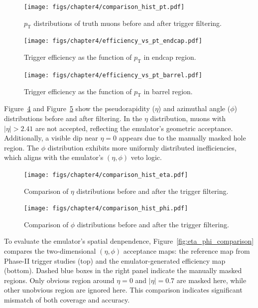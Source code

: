 \begin{figure}[htbp]
  \centering
  \texttt{[image: figs/chapter4/comparison\_hist\_pt.pdf]}
  \caption{$p_\mathrm{T}$ distributions of truth muons before and after trigger filtering.}
  \label{fig:comparison_hist_pt}
\end{figure}

\begin{figure}[htbp]
  \centering
  \texttt{[image: figs/chapter4/efficiency\_vs\_pt\_endcap.pdf]}
  \caption{Trigger efficiency as the function of $p_\mathrm{T}$ in endcap region.}
  \label{fig:eff_pt_endcap}
\end{figure}

\begin{figure}[htbp]
  \centering
  \texttt{[image: figs/chapter4/efficiency\_vs\_pt\_barrel.pdf]}
  \caption{Trigger efficiency as the function of $p_\mathrm{T}$ in barrel region.}
  \label{fig:eff_pt_barrel}
\end{figure}

Figure~\ref{fig:comparison_hist_eta} and Figure~\ref{fig:comparison_hist_phi} show the pseudorapidity ($\eta$) and azimuthal angle ($\phi$) distributions before and after filtering. In the $\eta$ distribution, muons with $|\eta| > 2.41$ are not accepted, reflecting the emulator's geometric acceptance. Additionally, a visible dip near $\eta = 0$ appears due to the manually masked hole region. The $\phi$ distribution exhibits more uniformly distributed inefficiencies, which aligns with the emulator's $(\eta, \phi)$ veto logic.

\begin{figure}[htbp]
  \centering
  \texttt{[image: figs/chapter4/comparison\_hist\_eta.pdf]}
  \caption{Comparison of $\eta$ distributions before and after the trigger filtering.}
  \label{fig:comparison_hist_eta}
\end{figure}

\begin{figure}[htbp]
  \centering
  \texttt{[image: figs/chapter4/comparison\_hist\_phi.pdf]}
  \caption{Comparison of $\phi$ distributions before and after the trigger filtering.}
  \label{fig:comparison_hist_phi}
\end{figure}

To evaluate the emulator's spatial denpendence, Figure~\ref{fig:eta_phi_comparison} compares the two-dimensional $(\eta, \phi)$ acceptance maps: the reference map from Phase-II trigger studies (top) and the emulator-generated efficiency map (bottom). Dashed blue boxes in the right panel indicate the manually masked regions. Only obvious region around $\eta = 0$ and $|\eta| = 0.7$ are masked here, while other unobvious region are ignored here. This comparison indicates significant mismatch of both coverage and accuracy.

